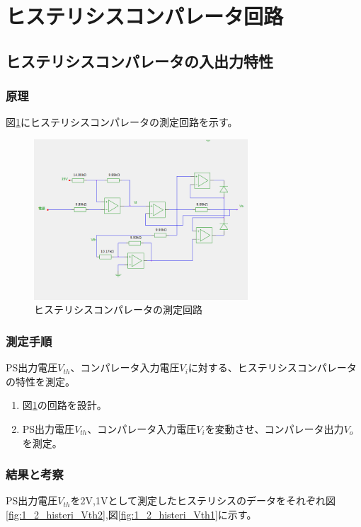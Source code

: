 \documentclass[11pt,a4j]{jsarticle}
\begin{document}
  
  \clearpage
    
 \section{ヒステリシスコンパレータ回路}
  \subsection{ヒステリシスコンパレータの入出力特性}
   \subsubsection{原理}
    
    図\ref{fig:histeri_tokusei}にヒステリシスコンパレータの測定回路を示す。
    
    \begin{figure}[htbp]
  \centering
  \includegraphics[width=8cm,clip]{histeri_tokusei.png}
  \caption{ヒステリシスコンパレータの測定回路}
  \label{fig:histeri_tokusei}
 \end{figure}%
    
   \subsubsection{測定手順}
    PS出力電圧$V_{th}$、コンパレータ入力電圧$V_i$に対する、ヒステリシスコンパレータの特性を測定。
    \begin{enumerate}
    \item 図\ref{fig:histeri_tokusei}の回路を設計。
    \item PS出力電圧$V_{th}$、コンパレータ入力電圧$V_i$を変動させ、コンパレータ出力$V_o$を測定。
    \end{enumerate}
    
   \subsubsection{結果と考察}
    PS出力電圧$V_{th}$を2V,1Vとして測定したヒステリシスのデータをそれぞれ図\ref{fig:1_2_histeri_Vth2},図\ref{fig:1_2_histeri_Vth1}に示す。
    
\end{document}
